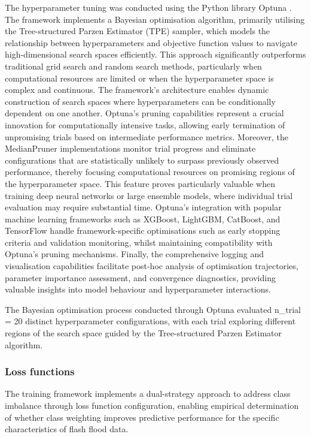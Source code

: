 The  hyperparameter tuning was conducted using the Python library Optuna \citep{Akiba_2019}. The framework implements a Bayesian optimisation algorithm, primarily utilising the Tree-structured Parzen Estimator (TPE) sampler, which models the relationship between hyperparameters and objective function values to navigate high-dimensional search spaces efficiently. This approach significantly outperforms traditional grid search and random search methods, particularly when computational resources are limited or when the hyperparameter space is complex and continuous. The framework's architecture enables dynamic construction of search spaces where hyperparameters can be conditionally dependent on one another. Optuna's pruning capabilities represent a crucial innovation for computationally intensive tasks, allowing early termination of unpromising trials based on intermediate performance metrics. Moreover, the MedianPruner implementations monitor trial progress and eliminate configurations that are statistically unlikely to surpass previously observed performance, thereby focusing computational resources on promising regions of the hyperparameter space. This feature proves particularly valuable when training deep neural networks or large ensemble models, where individual trial evaluation may require substantial time. Optuna's integration with popular machine learning frameworks such as XGBoost, LightGBM, CatBoost, and TensorFlow handle framework-specific optimisations such as early stopping criteria and validation monitoring, whilst maintaining compatibility with Optuna's pruning mechanisms. Finally, the comprehensive logging and visualisation capabilities facilitate post-hoc analysis of optimisation trajectories, parameter importance assessment, and convergence diagnostics, providing valuable insights into model behaviour and hyperparameter interactions.

The Bayesian optimisation process conducted through Optuna evaluated n\_trial = 20 distinct hyperparameter configurations, with each trial exploring different regions of the search space guided by the Tree-structured Parzen Estimator algorithm.


\subsubsection{Loss functions}

The training framework implements a dual-strategy approach to address class imbalance through loss function configuration, enabling empirical determination of whether class weighting improves predictive performance for the specific characteristics of flash flood data. 


